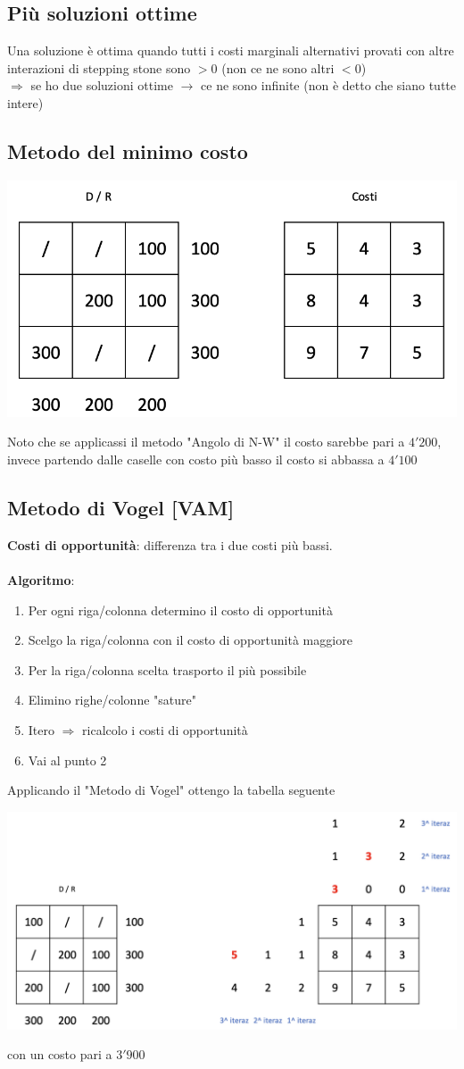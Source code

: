 \documentclass[12pt,a4paper]{article}
\begin{document}
\subsection{Più soluzioni ottime}
Una soluzione è ottima quando tutti i costi marginali alternativi provati con altre interazioni di stepping stone sono $>0$ (non ce ne sono altri $<0$)\\
$\Rightarrow$ se ho due soluzioni ottime $\rightarrow$ ce ne sono infinite (non è detto che siano tutte intere)

\subsection{Metodo del minimo costo}
\begin{center}
\includegraphics[width=0.5\columnwidth]{img/pb_trasporto_mincosto.png}
\end{center}
Noto che se applicassi il metodo "Angolo di N-W" il costo sarebbe pari a $4'200$, invece partendo dalle caselle con costo più basso il costo si abbassa a $4'100$

\subsection{Metodo di Vogel [VAM]}
\textbf{Costi di opportunità}: differenza tra i due costi più bassi.\\
\\
\textbf{Algoritmo}:
\begin{enumerate}
\item Per ogni riga/colonna determino il costo di opportunità
\item Scelgo la riga/colonna con il costo di opportunità maggiore
\item Per la riga/colonna scelta trasporto il più possibile
\item Elimino righe/colonne "sature"
\item Itero $\Rightarrow$ ricalcolo i costi di opportunità
\item Vai al punto 2
\end{enumerate}
Applicando il "Metodo di Vogel" ottengo la tabella seguente
\begin{center}
\includegraphics[width=0.4\columnwidth]{img/pb_trasporto_vogel.png}
\end{center}
con un costo pari a $3'900$
\end{document}
